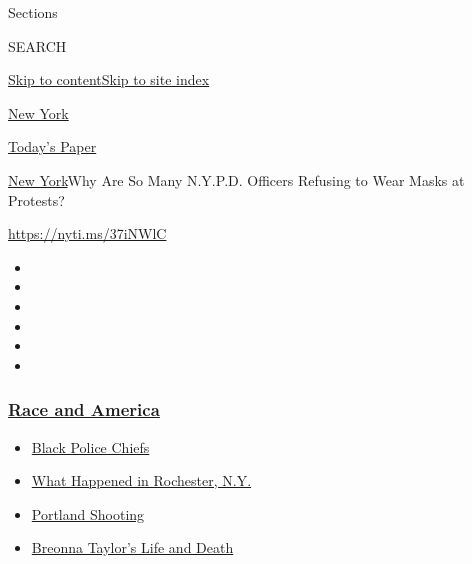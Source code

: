 Sections

SEARCH

\protect\hyperlink{site-content}{Skip to
content}\protect\hyperlink{site-index}{Skip to site index}

\href{https://www.nytimes3xbfgragh.onion/section/nyregion}{New York}

\href{https://myaccount.nytimes3xbfgragh.onion/auth/login?response_type=cookie\&client_id=vi}{}

\href{https://www.nytimes3xbfgragh.onion/section/todayspaper}{Today's
Paper}

\href{/section/nyregion}{New York}\textbar{}Why Are So Many N.Y.P.D.
Officers Refusing to Wear Masks at Protests?

\url{https://nyti.ms/37iNWlC}

\begin{itemize}
\item
\item
\item
\item
\item
\item
\end{itemize}

\hypertarget{race-and-america}{%
\subsubsection{\texorpdfstring{\href{https://www.nytimes3xbfgragh.onion/news-event/george-floyd-protests-minneapolis-new-york-los-angeles?name=styln-george-floyd\&region=TOP_BANNER\&block=storyline_menu_recirc\&action=click\&pgtype=Article\&impression_id=8f793b10-f4bb-11ea-8094-d5ba3891c9e8\&variant=undefined}{Race
and America}}{Race and America}}\label{race-and-america}}

\begin{itemize}
\tightlist
\item
  \href{https://www.nytimes3xbfgragh.onion/2020/09/11/us/black-police-chiefs-reform.html?name=styln-george-floyd\&region=TOP_BANNER\&block=storyline_menu_recirc\&action=click\&pgtype=Article\&impression_id=8f793b11-f4bb-11ea-8094-d5ba3891c9e8\&variant=undefined}{Black
  Police Chiefs}
\item
  \href{https://www.nytimes3xbfgragh.onion/2020/09/04/nyregion/rochester-police-daniel-prude.html?name=styln-george-floyd\&region=TOP_BANNER\&block=storyline_menu_recirc\&action=click\&pgtype=Article\&impression_id=8f793b12-f4bb-11ea-8094-d5ba3891c9e8\&variant=undefined}{What
  Happened in Rochester, N.Y.}
\item
  \href{https://www.nytimes3xbfgragh.onion/2020/08/30/us/portland-shooting-explained.html?name=styln-george-floyd\&region=TOP_BANNER\&block=storyline_menu_recirc\&action=click\&pgtype=Article\&impression_id=8f793b13-f4bb-11ea-8094-d5ba3891c9e8\&variant=undefined}{Portland
  Shooting}
\item
  \href{https://www.nytimes3xbfgragh.onion/2020/08/30/us/breonna-taylor-police-killing.html?name=styln-george-floyd\&region=TOP_BANNER\&block=storyline_menu_recirc\&action=click\&pgtype=Article\&impression_id=8f796220-f4bb-11ea-8094-d5ba3891c9e8\&variant=undefined}{Breonna
  Taylor's Life and Death}
\end{itemize}

